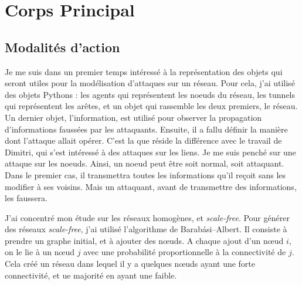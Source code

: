 \documentclass[11pt,a4paper]{article}
\begin{document}
\section{Corps Principal} %

\subsection{Modalités d'action}

	Je me suis dans un premier temps intéressé à la représentation des objets qui seront utiles pour la modélisation d'attaques sur un réseau.  Pour cela, j'ai utilisé des objets Pythons : les agents qui représentent les noeuds du réseau, les tunnels qui représentent les arêtes, et un objet qui rassemble les deux premiers, le réseau. Un dernier objet, l'information, est utilisé pour observer la propagation d'informations faussées par les attaquants. Ensuite, il a fallu définir la manière dont l'attaque allait opérer. C'est la que réside la différence avec le travail de Dimitri, qui s'est intéressé à des attaques sur les liens. Je me suis penché sur une attaque sur les noeuds. Ainsi, un noeud peut être soit normal, soit attaquant. Dans le premier cas, il transmettra toutes les informations qu'il reçoit sans les modifier à ses voisins. Mais un attaquant, avant de transmettre des informations, les faussera. 
	
\begin{center}
\end{center} 

	J'ai concentré mon étude sur les réseaux homogènes, et \emph{scale-free}. Pour générer des réseaux \emph{scale-free}, j'ai utilisé l'algorithme de Barabási–Albert. Il consiste à prendre un graphe initial, et à ajouter des nœuds. A chaque ajout d'un nœud $i$, on le lie à un nœud $j$ avec une probabilité proportionnelle à la connectivité de $j$. Cela créé un réseau dans lequel il y a quelques nœuds ayant une forte connectivité, et ue majorité en ayant une faible.
	
\end{document}
